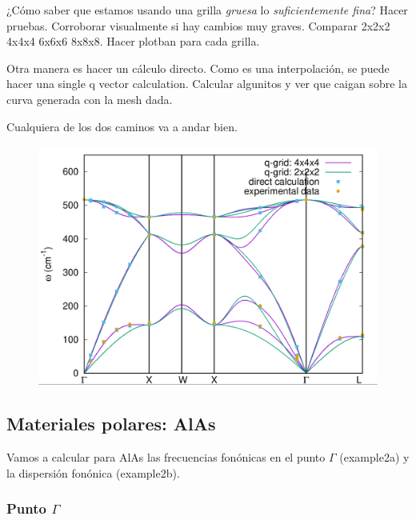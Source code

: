   ¿Cómo saber que estamos usando una grilla \emph{gruesa} lo \emph{suficientemente fina}? Hacer pruebas. Corroborar visualmente si hay cambios muy graves. Comparar 2x2x2 4x4x4 6x6x6 8x8x8. Hacer plotban para cada grilla.

  Otra manera es hacer un cálculo directo. Como es una interpolación, se puede hacer una single q vector calculation. Calcular algunitos y ver que caigan sobre la curva generada con la mesh dada.

  Cualquiera de los dos caminos va a andar bien.
  \begin{figure}[H]
    \centering
    \includegraphics[scale = 0.35]{figs/D5/Si_disp.png}
  \end{figure}

\subsection{Materiales polares: AlAs}

  Vamos a calcular para AlAs las frecuencias fonónicas en el punto $\Gamma$ (example2a) y la dispersión fonónica (example2b).

\subsubsection{Punto $\Gamma$}

